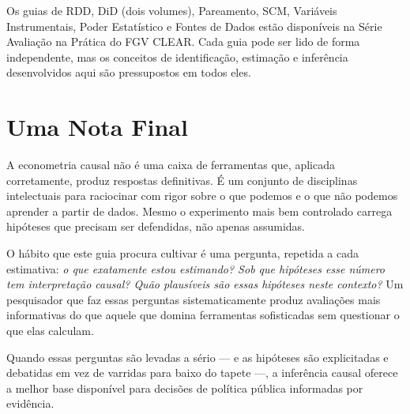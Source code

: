 \begin{conexaobox}
Os guias de RDD, DiD (dois volumes), Pareamento, SCM, Variáveis Instrumentais,
Poder Estatístico e Fontes de Dados estão disponíveis na Série Avaliação na
Prática do FGV CLEAR. Cada guia pode ser lido de forma independente, mas os
conceitos de identificação, estimação e inferência desenvolvidos aqui são
pressupostos em todos eles.
\end{conexaobox}


\section{Uma Nota Final}

A econometria causal não é uma caixa de ferramentas que, aplicada
corretamente, produz respostas definitivas. É um conjunto de disciplinas
intelectuais para raciocinar com rigor sobre o que podemos e o que não podemos
aprender a partir de dados. Mesmo o experimento mais bem controlado carrega
hipóteses que precisam ser defendidas, não apenas assumidas.

O hábito que este guia procura cultivar é uma pergunta, repetida a cada estimativa: \textit{o que exatamente estou estimando? Sob que hipóteses esse número tem interpretação causal? Quão plausíveis são essas hipóteses neste contexto?} Um pesquisador que faz essas perguntas sistematicamente produz avaliações mais informativas do que aquele que domina ferramentas sofisticadas sem questionar o que elas calculam.

Quando essas perguntas são levadas a sério --- e as hipóteses são explicitadas e debatidas em vez de varridas para baixo do tapete ---, a inferência causal oferece a melhor base disponível para decisões de política pública informadas por evidência.